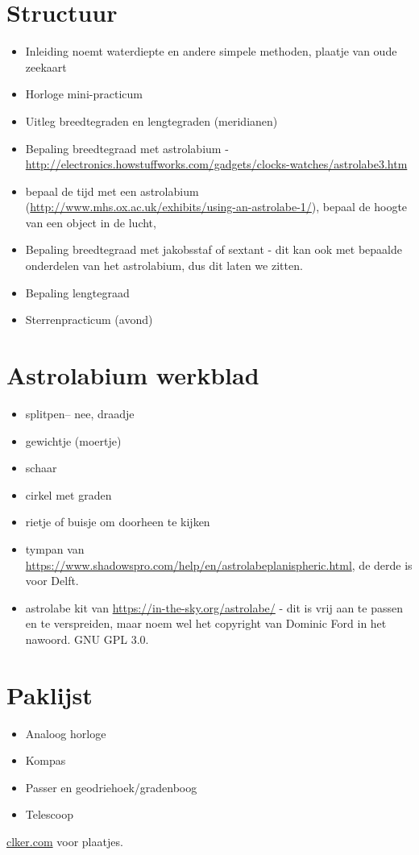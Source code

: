 \documentclass[a4paper,10pt]{article}
\begin{document}
\section{Structuur}
\begin{itemize}
 \item Inleiding noemt waterdiepte en andere simpele methoden, plaatje van oude zeekaart
 \item Horloge mini-practicum
 \item Uitleg breedtegraden en lengtegraden (meridianen)
 \item Bepaling breedtegraad met astrolabium - \url{http://electronics.howstuffworks.com/gadgets/clocks-watches/astrolabe3.htm}
 \item bepaal de tijd met een astrolabium (\url{http://www.mhs.ox.ac.uk/exhibits/using-an-astrolabe-1/}), bepaal de hoogte van een object in de lucht, 
 \item Bepaling breedtegraad met jakobsstaf of sextant - dit kan ook met bepaalde onderdelen van het astrolabium, dus dit laten we zitten.
 \item Bepaling lengtegraad
 \item Sterrenpracticum (avond)
\end{itemize}

\section{Astrolabium werkblad}
\begin{itemize}
\item splitpen-- nee, draadje
\item gewichtje (moertje)
\item schaar
\item cirkel met graden 
\item rietje of buisje om doorheen te kijken
\item tympan van \url{https://www.shadowspro.com/help/en/astrolabeplanispheric.html}, de derde is voor Delft.
\item astrolabe kit van \url{https://in-the-sky.org/astrolabe/} - dit is vrij aan te passen en te verspreiden, maar noem wel het copyright van Dominic Ford in het nawoord. GNU GPL 3.0.
\end{itemize}

\section{Paklijst}
\begin{itemize}
 \item Analoog horloge
 \item Kompas
 \item Passer en geodriehoek/gradenboog
 \item Telescoop
\end{itemize}

\url{clker.com} voor plaatjes.
\end{document}
